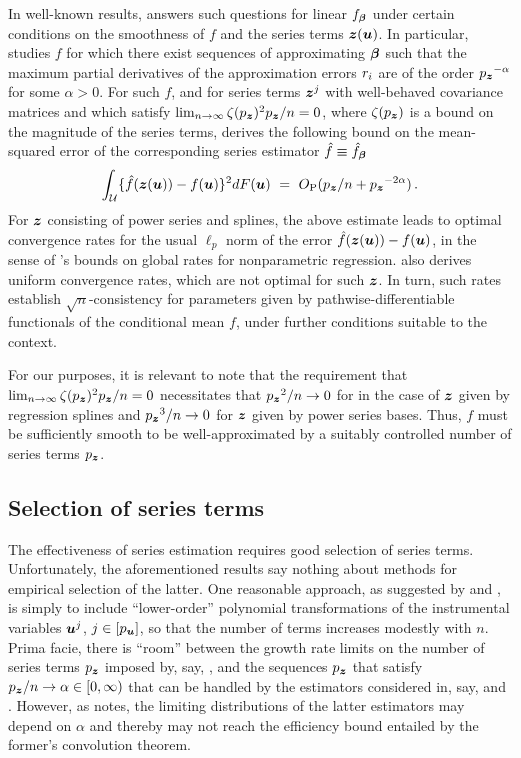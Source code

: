 \documentclass{uwstat572}
\newcommand{\benn}{\begin{equation*}}
\newcommand{\eenn}{\end{equation*}}
\theoremstyle{definition}
\theoremstyle{remark}
\newcommand{\ga}{\alpha}
\newcommand{\Prb}{\mathrm{P}}
\newcommand{\bs}[1]{\boldsymbol{#1}}
\numberwithin{equation}{section}
\begin{document}
In well-known results, \cite{N97} answers such questions for linear $\fb$ under certain conditions on the smoothness of $f$ and the series terms $\z(\u)$. In particular, \cite{N97} studies $f$ for which there exist sequences of approximating $\regb$ such that the maximum partial derivatives of the approximation errors $r_i$ are of the order $\pz^{-\ga}$ for some $\ga > 0$. For such $f$, and for series terms $\z^j$ with well-behaved covariance matrices and which satisfy $\lim_{n\to\infty} \zeta(\pz)^2\pz/n = 0$, where $\zeta(\pz)$ is a bound on the magnitude of the series terms, \cite{N97} derives the following bound on the mean-squared error of the corresponding series estimator $\fhc \equiv \fhc_{\regb}$
\benn
	\int_{\Us} \{\fhc(\z(\u)) - f(\u)\}^2 dF(\u) \ = \ O_\Prb(\pz/n + \pz^{-2\ga}) \,.
\eenn
For $\z$ consisting of power series and splines, the above estimate leads to optimal convergence rates for the usual $\ell_p$ norm of the error $\fhc(\z(\u)) - f(\u)$, in the sense of \cite{S82}'s bounds on global rates for nonparametric regression. \cite{N97} also derives uniform convergence rates, which are not optimal for such $\z$. In turn, such rates establish $\sqrt{n}$-consistency for parameters given by pathwise-differentiable functionals of the conditional mean $f$, under further conditions suitable to the context.  

For our purposes, it is relevant to note that the requirement that $\lim_{n\to\infty} \zeta(\pz)^2\pz/n = 0$ necessitates that $\pz^2/n \to 0$ for in the case of $\z$ given by regression splines and $\pz^3/n \to 0$ for $\z$ given by power series bases. Thus, $f$ must be sufficiently smooth to be well-approximated by a suitably controlled number of series terms $\pz$.


%
\subsection{Selection of series terms}
\renewcommand{\P}{\bs{P}}

The effectiveness of series estimation requires good selection of series terms. Unfortunately, the aforementioned results say nothing about methods for empirical selection of the latter. One reasonable approach, as suggested by \cite{A74} and \cite{K71}, is simply to include ``lower-order'' polynomial transformations of the instrumental variables $\u^j$, $j\in[\pu]$, so that the number of terms increases modestly with $n$. Prima facie, there is ``room'' between the growth rate limits on the number of series terms $\pz$ imposed by, say, \cite{N97}, and the sequences $\pz$ that satisfy $\pz/n \to \ga \in [0, \infty)$ that can be handled by the estimators considered in, say, \cite{B94} and \cite{HHN08}. However, as \cite{H02} notes, the limiting distributions of the latter estimators may depend on $\ga$ and thereby may not reach the efficiency bound entailed by the former's convolution theorem. 
\end{document}
